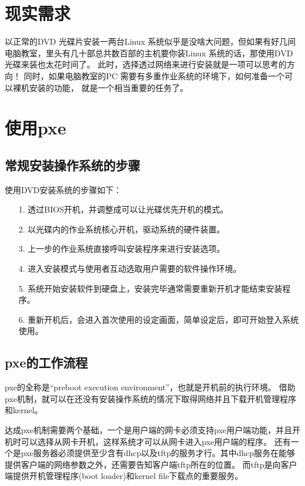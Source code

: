 \documentclass[a4paper,left=2.5cm,right=2.5cm,11pt]{article}
\begin{document}
\tableofcontents

\clearpage

\section{现实需求}
	以正常的DVD 光碟片安装一两台Linux 系统似乎是没啥大问题，但如果有好几间电脑教室，里头有几十部总共数百部的主机要你装Linux 系统的话，那使用DVD 光碟来装也太花时间了。
	此时，选择透过网络来进行安装就是一项可以思考的方向！ 
	同时，如果电脑教室的PC 需要有多重作业系统的环境下，如何准备一个可以裸机安装的功能， 就是一个相当重要的任务了。

\section{使用pxe}
\subsection{常规安装操作系统的步骤}
	使用DVD安装系统的步骤如下：
	\begin{itemize}
		\item[1.] 透过BIOS开机，并调整成可以让光碟优先开机的模式。
		\item[2.] 以光碟内的作业系统核心开机，驱动系统的硬件装置。
		\item[3.] 上一步的作业系统直接呼叫安装程序来进行安装选项。
		\item[4.] 进入安装模式与使用者互动选取用户需要的软件操作环境。
		\item[5.] 系统开始安装软件到硬盘上，安装完毕通常需要重新开机才能结束安装程序。
		\item[6.] 重新开机后，会进入首次使用的设定画面，简单设定后，即可开始登入系统使用。
	\end{itemize}

\subsection{pxe的工作流程}

	pxe的全称是“preboot execution environment”，也就是开机前的执行环境。
	借助pxe机制，就可以在还没有安装操作系统的情况下取得网络并且下载开机管理程序和kernel。\par

	达成pxe机制需要两个基础，一个是用户端的网卡必须支持pxe用户端功能，并且开机时可以选择从网卡开机，这样系统才可以从网卡进入pxe用户端的程序。
	还有一个是pxe服务器必须提供至少含有dhcp以及tftp的服务才行。其中dhcp服务在能够提供客户端的网络参数之外，还需要告知客户端tftp所在的位置。
	而tftp是向客户端提供开机管理程序(boot loader)和kernel file下载点的重要服务。\par
\end{document}

